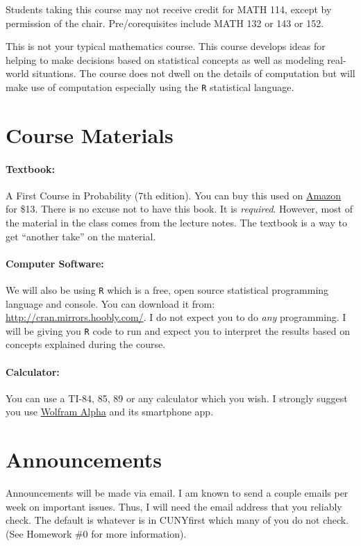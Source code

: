 \documentclass[12pt]{article}
\begin{document}
Students taking this course may not receive credit for MATH 114, except by permission of the chair. Pre/corequisites include MATH 132 or 143 or 152.

This is not your typical mathematics course. This course develops ideas for helping to make decisions based on statistical concepts as well as modeling real-world situations. The course does not dwell on the details of computation but will make use of computation especially using the \texttt{R} statistical language.


\section*{Course Materials}

\paragraph{Textbook:} A First Course in Probability (7th edition). You can buy this used on \href{http://www.amazon.com/First-Course-Probability-7th-Edition/dp/0131856626}{Amazon} for \$13. There is no excuse not to have this book. It is \textit{required}. However, most of the material in the class comes from the lecture notes. The textbook is a way to get ``another take'' on the material.

\paragraph{Computer Software:} We will also be using \texttt{R} which is a free, open source statistical programming language and console. You can download it from: \url{http://cran.mirrors.hoobly.com/}. I do not expect you to do \textit{any} programming. I will be giving you \texttt{R} code to run and expect you to interpret the results based on concepts explained during the course.

\paragraph{Calculator:} You can use a TI-84, 85, 89 or any calculator which you wish. I strongly suggest you use \href{http://www.wolframalpha.com/}{Wolfram Alpha} and its smartphone app.

\section*{Announcements}

Announcements will be made via email. I am known to send a couple emails per week on important issues. Thus, I will need the email address that you reliably check. The default is whatever is in CUNYfirst which many of you do not check. (See Homework \#0 for more information).
\end{document}

